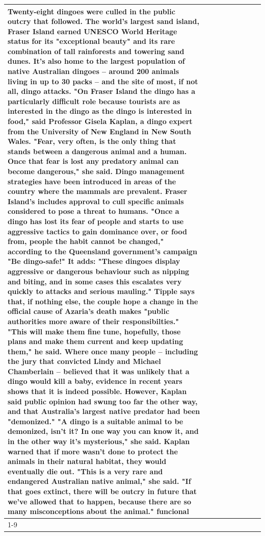 \begin{table}[H]
\begin{tabular}{lllrlllll}
Twenty-eight dingoes were culled in the public outcry that followed. The world's largest sand island, Fraser Island earned UNESCO World Heritage status for its "exceptional beauty" and its rare combination of tall rainforests and towering sand dunes. It's also home to the largest population of native Australian dingoes -- around 200 animals living in up to 30 packs -- and the site of most, if not all, dingo attacks. "On Fraser Island the dingo has a particularly difficult role because tourists are as interested in the dingo as the dingo is interested in food," said Professor Gisela Kaplan, a dingo expert from the University of New England in New South Wales. "Fear, very often, is the only thing that stands between a dangerous animal and a human. Once that fear is lost any predatory animal can become dangerous," she said. Dingo management strategies have been introduced in areas of the country where the mammals are prevalent. Fraser Island's includes approval to cull specific animals considered to pose a threat to humans. "Once a dingo has lost its fear of people and starts to use aggressive tactics to gain dominance over, or food from, people the habit cannot be changed," according to the Queensland government's campaign "Be dingo-safe!" It adds: "These dingoes display aggressive or dangerous behaviour such as nipping and biting, and in some cases this escalates very quickly to attacks and serious mauling." Tipple says that, if nothing else, the couple hope a change in the official cause of Azaria's death makes "public authorities more aware of their responsibilties." "This will make them fine tune, hopefully, those plans and make them current and keep updating them," he said. Where once many people -- including the jury that convicted Lindy and Michael Chamberlain -- believed that it was unlikely that a dingo would kill a baby, evidence in recent years shows that it is indeed possible. However, Kaplan said public opinion had swung too far the other way, and that Australia's largest native predator had been "demonized." "A dingo is a suitable animal to be demonized, isn't it? In one way you can know it, and in the other way it's mysterious," she said. Kaplan warned that if more wasn't done to protect the animals in their natural habitat, they would eventually die out. "This is a very rare and endangered Australian native animal," she said. "If that goes extinct, there will be outcry in future that we've allowed that to happen, because there are so many misconceptions about the animal." funcional \\
\cline{1-9}

\end{tabular}
\end{table}
